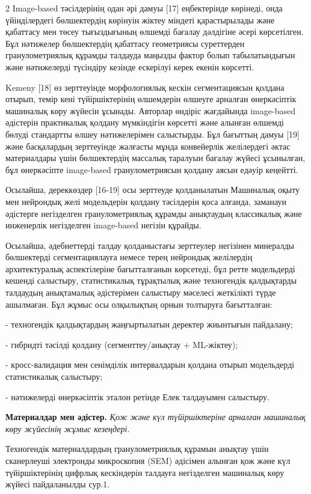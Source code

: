 \begin{multicols}{2}
Image-based тәсілдерінің одан әрі дамуы {[}17{]} еңбектерінде көрінеді,
онда үйінділердегі бөлшектердің көрінуін жіктеу міндеті қарастырылады
және қабаттасу мен төсеу тығыздығының өлшемді бағалау дәлдігіне әсері
көрсетілген. Бұл нәтижелер бөлшектердің қабаттасу геометриясы
суреттерден гранулометриялық құрамды талдауда маңызды фактор болып
табылатындығын және нәтижелерді түсіндіру кезінде ескерілуі керек екенін
көрсетті.

Kemeny {[}18{]} өз зерттеуінде морфологиялық кескін сегментациясын
қолдана отырып, темір кені түйіршіктерінің өлшемдерін өлшеуге арналған
өнеркәсіптік машиналық көру жүйесін ұсынады. Авторлар өндіріс жағдайында
image-based әдістерін практикалық қолдану мүмкіндігін көрсетті және
алынған өлшемді бөлуді стандартты өлшеу нәтижелерімен салыстырды. Бұл
бағыттың дамуы {[}19{]} және басқалардың зерттеуінде жалғасты мұнда
конвейерлік желілердегі әктас материалдары үшін бөлшектердің массалық
таралуын бағалау жүйесі ұсынылған, бұл өнеркәсіпте image-based
гранулометриясын қолдану аясын едәуір кеңейтті.

Осылайша, дереккөздер {[}16-19{]} осы зерттеуде қолданылатын Машиналық
оқыту мен нейрондық желі модельдерін қолдану тәсілдерін қоса алғанда,
заманауи әдістерге негізделген гранулометриялық құрамды анықтаудың
классикалық және инженерлік негізделген image-based негізін құрайды.

Осылайша, әдебиеттерді талдау қолданыстағы зерттеулер негізінен
минералды бөлшектерді сегментациялауға немесе терең нейрондық желілердің
архитектуралық аспектілеріне бағытталғанын көрсетеді, бұл ретте
модельдерді кешенді салыстыру, статистикалық тұрақтылық және техногендік
қалдықтарды талдаудың анықтамалық әдістерімен салыстыру мәселесі
жеткілікті түрде ашылмаған. Бұл жұмыс осы олқылықтың орнын толтыруға
бағытталған:

- техногендік қалдықтардың жаңғыртылатын деректер жиынтығын пайдалану;

- гибридті тәсілді қолдану (сегменттеу/анықтау + ML-жіктеу);

- кросс-валидация мен сенімділік интервалдарын қолдана отырып
модельдерді статистикалық салыстыру;

- нәтижелерді өнеркәсіптік эталон ретінде Елек талдауымен салыстыру.

{\bfseries Материалдар мен әдістер.} \emph{Қож және күл түйіршіктеріне
арналған машиналық көру жүйесінің жұмыс кезеңдері.}

Техногендік материалдардың гранулометриялық құрамын анықтау үшін
сканерлеуші электронды микроскопия (SEM) әдісімен алынған қож және күл
түйіршіктерінің цифрлық кескіндерін талдауға негізделген машиналық көру
жүйесі пайдаланылды сур.1.
\end{multicols}

